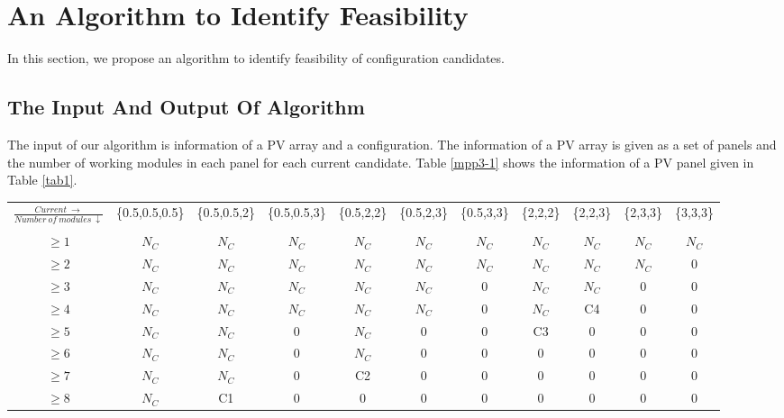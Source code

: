 \documentclass[conference]{IEEEtran}
\begin{document}
\section{An Algorithm to Identify Feasibility}
In this section, we propose an algorithm to identify feasibility of configuration candidates.
\subsection{The Input And Output Of Algorithm}

The input of our algorithm is information of a PV array and a configuration. The information of a PV array is given as a set of panels and the number of working modules in each panel for each current candidate. Table \ref{mpp3-1} shows the information of a PV panel given in Table \ref{tab1}.
\begin{table}[htbp]
  \begin{center}
    \begin{tabular}[]{ccccccccccc}
 $\frac{Current\ \rightarrow }{Number\ of\ modules\ \downarrow}$&\{0.5,0.5,0.5\}&\{0.5,0.5,2\}&\{0.5,0.5,3\}&\{0.5,2,2\}&\{0.5,2,3\}&\{0.5,3,3\}&\{2,2,2\}&\{2,2,3\}&\{2,3,3\}&\{3,3,3\}\\  \\ \hline \hline
$\geq 1$ &$N_C$  &$N_C$  &$N_C$  &$N_C$  &$N_C$  &$N_C$  &$N_C$  &$N_C$  &$N_C$  &$N_C$  \\
$\geq 2$ &$N_C$  &$N_C$  &$N_C$  &$N_C$  &$N_C$  &$N_C$  &$N_C$  &$N_C$  &$N_C$  &0  \\
$\geq 3$ &$N_C$  &$N_C$  &$N_C$  &$N_C$  &$N_C$  &0  &$N_C$  &$N_C$  &0      &0 \\
$\geq 4$ &$N_C$  &$N_C$  &$N_C$  &$N_C$  &$N_C$  &0  &$N_C$  & C4    &0      &0 \\
$\geq 5$ &$N_C$  &$N_C$  &0      &$N_C$  &0     &0      &C3     &0      &0      &0  \\
$\geq 6$ &$N_C$  &$N_C$  &0      &$N_C$  &0     &0      &0      &0      &0      &0 \\
$\geq 7$ &$N_C$  &$N_C$  &0      &C2     &0     &0      &0      &0      &0      &0 \\
$\geq 8$ &$N_C$  &C1     &0      &0      &0     &0      &0      &0      &0      &0
    \end{tabular}\label{mppcandidates}
    \end{center}
\end{table}
\end{document}
